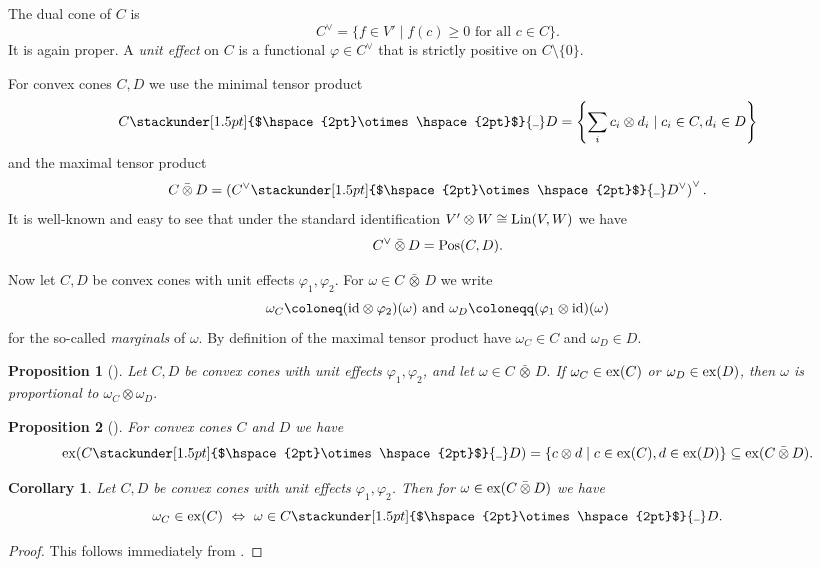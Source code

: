\documentclass[11pt]{article}
\newcommand\barbelow[1]{\stackunder[1.5pt]{$\hspace{2pt}#1\hspace{2pt}$}{\rule{1ex}{0.075ex}}}
\newcommand{\barabove}[1]{\hspace{2pt}\bar{#1}\hspace{2pt}}
\theoremstyle{result}
\newtheorem{corollary}[corollary]{Corollary}
\newtheorem{proposition}[proposition]{Proposition}
\theoremstyle{discussion}
\newcommand{\omin}{\barbelow{\otimes}}
\newcommand{\omax}{\barabove{\otimes}}
\begin{document}
The dual cone of $C$ is
\[
    C^\vee=\{f\in V'\mid f(c)\geqslant0\text{ for all }c\in C\}.
\]
It is again proper. A \emph{unit effect} on $C$ is a functional
$\varphi\in C^\vee$ that is strictly positive on $C\setminus\{0\}$.

For convex cones $C,D$ we use the minimal tensor product 
$$
    C\omin D=\left\{ \sum_i c_i\otimes d_i\mid c_i\in C,d_i\in D\right\}
$$
and the maximal tensor product
$$
    C\omax D=\left( C^\vee\omin D^\vee\right)^\vee.
$$ 
It is well-known and easy to see that under the standard identification 
$V'\otimes W\cong {\rm Lin}(V,W)$
we have
$$
    C^\vee\omax D = {\rm Pos}(C,D).
$$

Now let $C, D$ be convex cones with unit effects $\varphi_1,\varphi_2$. For $\omega\in C\omax D$ we write 
$$
    \omega_C\coloneq ({\rm id}\otimes \varphi_2)(\omega) \mbox{ and } \omega_D\coloneqq(\varphi_1\otimes{\rm id})(\omega)
$$ 
for the so-called \emph{marginals} of $\omega.$ By definition of the maximal tensor product have $\omega_C\in C$ and $\omega_D\in D.$

\begin{proposition}[{\citealp[Lemma~3]{BarnumEtAl2006}}]
\label{prop:pure-marginal-product}
    Let $C, D$ be convex cones with unit effects $\varphi_1,\varphi_2$, and let  $\omega\in C\omax D.$  If  $\omega_C\in{\rm ex}(C)$ or $\omega_D\in{\rm ex}(D)$, then $\omega$ is proportional to $\omega_C\otimes \omega_D.$
\end{proposition}

\begin{proposition}[{\citealp[Theorem 3.22 and Proposition 4.48]{vanDobbenDeBruyn2020}}]
\label{prop:extreme-rays-tensor-cones}
    For convex cones $C$ and $D$ we have 
    $$
        {\rm ex}(C\omin D)=\{ c\otimes d\mid c\in{\rm ex}(C), d\in{\rm ex}(D)\}\subseteq{\rm ex}(C\omax D).
    $$
\end{proposition}

\begin{corollary}
\label{cor:minmax}
    Let $C, D$ be convex cones with unit effects $\varphi_1,\varphi_2$.
    Then for $\omega\in{\rm ex}(C\omax D)$ we have 
    $$
        \omega_C\in{\rm ex}(C)\ \Leftrightarrow\  \omega\in C\omin D.
    $$
\end{corollary}

\begin{proof}
    This follows immediately from .
\end{proof}
\end{document}
